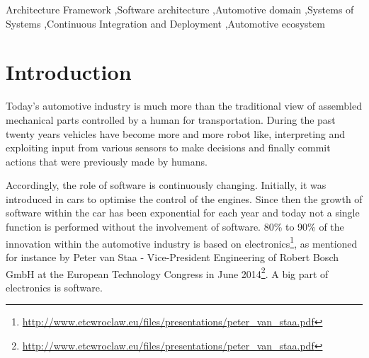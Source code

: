\documentclass[preprint,12pt,3p]{elsarticle}
\newcommand\patrizio[1]{\nb{Patrizio}{#1}}
\begin{document}
\begin{frontmatter}
\begin{keyword}
Architecture Framework \sep Software architecture \sep Automotive domain \sep Systems of Systems \sep Continuous Integration and Deployment \sep Automotive ecosystem
\end{keyword}

\end{frontmatter}


\section{Introduction}
\label{sec:intro}

Today's automotive industry is much more than the traditional view of assembled
mechanical parts controlled by a human for transportation. During the past
twenty years vehicles have become more and more robot like, interpreting and
exploiting input from various sensors to make decisions and finally commit
actions that were previously made by humans.  

Accordingly, the role of software is continuously changing. Initially, it was introduced in cars to optimise the
control of the engines. Since then the growth of software within the car has
been exponential for each year and today not a single function is performed
without the involvement of software. 
80\% to 90\% of the innovation within the automotive industry is based on electronics\footnote{\url{http://www.etcwroclaw.eu/files/presentations/peter_van_staa.pdf}}, 
as mentioned for instance by Peter van Staa - Vice-President Engineering of Robert Bosch GmbH at the European Technology Congress in June 2014\footnote{\url{http://www.etcwroclaw.eu/files/presentations/peter_van_staa.pdf}}. 
A big part of electronics is software.
\end{document}
